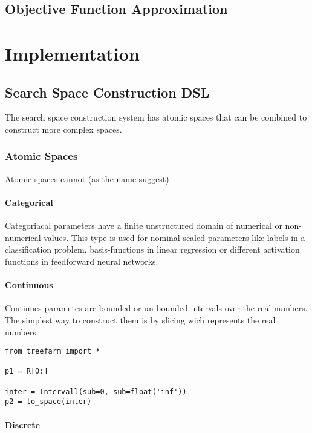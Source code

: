 \documentclass[english]{article}
\begin{document}
\subsection{Objective Function Approximation}


\section{Implementation}
\subsection{Search Space Construction DSL}
The search space construction system has atomic spaces that can
be combined to construct more complex spaces.

\subsubsection{Atomic Spaces}
Atomic spaces cannot (as the name suggest)

\paragraph{Categorical}
Categoriacal parameters have a finite unstructured domain of numerical or non-numerical values. This type is used for nominal scaled parameters like labels in a classification problem, basis-functions in linear regression or different activation functions in feedforward neural networks.

\paragraph{Continuous}
Continues parametes are bounded or un-bounded intervals over the real numbers. The simplest way to construct them is by slicing wich represents the real numbers.

\begin{verbatim}
from treefarm import *

p1 = R[0:]

inter = Intervall(sub=0, sub=float('inf'))
p2 = to_space(inter)

\end{verbatim}


\paragraph{Discrete}
\end{document}
